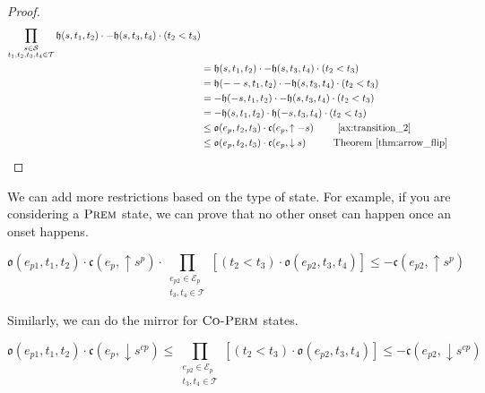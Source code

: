 \begin{proof}
    \begin{align*}
        \prod_{\substack{s \in \mathcal{S} \\ t_1, t_2, t_3, t_4 \in \mathcal{T}}}\mathfrak{h}(s, t_1, t_2) \cdot - \mathfrak{h}(s, t_3, t_4) \cdot (t_2 < t_3)  \\
        &=\mathfrak{h}(s, t_1, t_2) \cdot - \mathfrak{h}(s, t_3, t_4) \cdot (t_2 < t_3)                                                               \\
         & = \mathfrak{h}(-- s, t_1, t_2) \cdot - \mathfrak{h}(s, t_3, t_4) \cdot (t_2 < t_3)                                                       \\
         & = - \mathfrak{h}(- s, t_1, t_2) \cdot - \mathfrak{h}(s, t_3, t_4) \cdot (t_2 < t_3)                                                      \\
         & = - \mathfrak{h}(s, t_1, t_2)   \cdot \mathfrak{h}(-s, t_3, t_4) \cdot (t_2 < t_3)                                                       \\
         & \leq \mathfrak{o}(e_p, t_2, t_3) \cdot \mathfrak{c}(e_p, \uparrow - s) \hspace{0.06 \linewidth} \text{~\ref{ax:transition_2}}       \\
         & \leq \mathfrak{o}(e_p, t_2, t_3) \cdot \mathfrak{c}(e_p, \downarrow s) \hspace{0.06 \linewidth}  \ \ \text{Theorem~\ref{thm:arrow_flip}}
    \end{align*}
\end{proof}

We can add more restrictions based on the type of state. For example, if you are considering
a $\textsc{Prem}$ state, we can prove that no other onset can happen once an onset happens.

\begin{theorem}
    \begin{equation}
        \mathfrak{o}(e_{p1}, t_1, t_2) \cdot \mathfrak{c}(e_p, \uparrow s^{p}) \cdot
        \prod_{\substack{e_{p2} \in \mathcal{E}_p \\ t_3, t_4 \in \mathcal{T}}}[(t_2 < t_3) \cdot \mathfrak{o}(e_{p2}, t_3, t_4) ]
        \leq - \mathfrak{c}(e_{p2}, \uparrow s^{p})
    \end{equation}
\end{theorem}

Similarly, we can do the mirror for $\textsc{Co-Perm}$ states.

\begin{theorem}
    \begin{equation}
        \mathfrak{o}(e_{p1}, t_1, t_2) \cdot \mathfrak{c}(e_p, \downarrow s^{cp}) \leq
        \prod_{\substack{e_{p2} \in \mathcal{E}_p \\ t_3, t_4 \in \mathcal{T}}}[(t_2 < t_3) \cdot \mathfrak{o}(e_{p2}, t_3, t_4) ]
        \leq - \mathfrak{c}(e_{p2}, \downarrow s^{cp})
    \end{equation}
\end{theorem}

